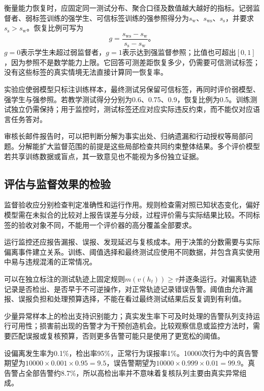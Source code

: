 衡量能力恢复时，应固定同一测试分布、聚合口径及数值越大越好的指标。记弱监督者、弱标签训练的强学生、可信标签训练的强参照得分为$s_{\mathrm w}$、$s_{\mathrm{ws}}$、$s_{\mathrm s}$，并要求$s_{\mathrm s}>s_{\mathrm w}$。恢复比例可写为
\begin{equation}
 g=\frac{s_{\mathrm{ws}}-s_{\mathrm{w}}}
          {s_{\mathrm{s}}-s_{\mathrm{w}}}\text{。}
 \label{eq:alignment-weak-strong-recovery}
\end{equation}
$g=0$表示学生未超过弱监督者，$g=1$表示达到强监督参照；比值也可超出$[0,1]$，因为参照不是数学能力上限。它回答可测差距恢复多少，仍需要可信测试标签；没有这些标签的真实情境无法直接计算同一恢复率。

实验应使弱模型只标注训练样本，最终测试另保留可信标签，再同时评价弱模型、强学生与强参照。若教学测试得分分别为0.6、0.75、0.9，恢复比例为0.5。训练测试独立仍需保持；用于监控时，测试标签还应对应实际违反约束，而不能仅对应语言任务答对。

审核长邮件报告时，可以把判断分解为事实出处、归纳遗漏和行动授权等局部问题。分解能扩大监督范围的前提是这些局部检查共同约束整体结果。多个评价模型若共享训练数据或盲点，其一致意见也不能视为多份独立证据。

\subsection{评估与监督效果的检验}
\label{sec:alignment-oversight-validation}

监督验收应分别检查判定准确性和运行作用。规则检查需对照已知状态变化，偏好模型需在未拟合的比较对上报告误差与分歧，过程评价需与实际结果比较。不同标签的验收对象不同，不能用一个评价器的高分覆盖全部要求。

运行监控还应报告漏报、误报、发现延迟与复核成本。用于决策的分数需要与实际偏离事件建立关系。训练、阈值选择和最终测试应使用不同数据，并包含真实使用中易与违规混淆的正常情况。

可以在独立标注的测试轨迹上固定规则$m(v(h_t))\geq\tau$并逐条运行。对偏离轨迹记录是否检出、是否早于不可逆操作，对正常轨迹记录错误告警。阈值由允许漏报、误报负担和处理预算选择，不能在看过最终测试结果后反复调到有利值。

少量异常样本上的检出支持识别能力；真实发生率下可及时处理的告警队列支持运行可用性；损害前出现的告警才为干预创造机会。比较观察信息或监控方法时，需要匹配误报或复核预算，否则更多告警可能只是使用了更宽松的阈值。

\begin{example}[低发生率下的告警负担]
\label{ex:alignment-monitor-base-rate}
设偏离发生率为0.1\%，检出率95\%，正常行为误报率1\%。10000次行为中的真告警期望为$10000\times0.001\times0.95=9.5$，误告警期望为$10000\times0.999\times0.01=99.9$。真告警占全部告警约8.7\%，所以高检出率并不意味着复核队列主要由真实异常组成。
\end{example}

